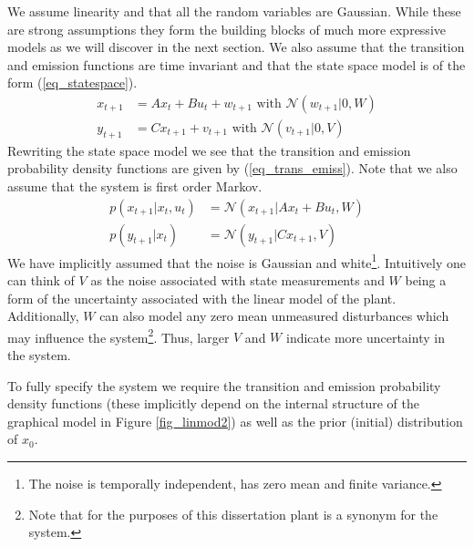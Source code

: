 We assume linearity and that all the random variables are Gaussian. While these are strong assumptions they form the building blocks of much more expressive models as we will discover in the next section. We also assume that the transition and emission functions are time invariant and that the state space model is of the form (\ref{eq_statespace}).
\begin{equation}
\begin{aligned}
x_{t+1} &= Ax_t + Bu_t + w_{t+1} \text{ with } \mathcal{N}(w_{t+1}|0,W) \\
y_{t+1} &= Cx_{t+1} + v_{t+1}  \text{ with } \mathcal{N}(v_{t+1}|0,V)
\end{aligned}
\label{eq_statespace}
\end{equation}
Rewriting the state space model we see that the transition and emission probability density functions are given by (\ref{eq_trans_emiss}). Note that we also assume that the system is first order Markov.
\begin{equation}
\begin{aligned}
p(x_{t+1}|x_t, u_t)&= \mathcal{N}(x_{t+1}|Ax_t+Bu_t, W) \\
p(y_{t+1}|x_t) &= \mathcal{N}(y_{t+1}|Cx_{t+1}, V)
\end{aligned}
\label{eq_trans_emiss}
\end{equation}
We have implicitly assumed that the noise is Gaussian and white\footnote{The noise is temporally independent, has zero mean and finite variance.}. Intuitively one can think of $V$ as the noise associated with state measurements and $W$ being a form of the uncertainty associated with the linear model of the plant. Additionally, $W$ can also model any zero mean unmeasured disturbances which may influence the system\footnote{Note that for the purposes of this dissertation plant is a synonym for the system.}. Thus, larger $V$ and $W$ indicate more uncertainty in the system. 

To fully specify the system we require the transition and emission probability density functions (these implicitly depend on the internal structure of the graphical model in Figure \ref{fig_linmod2}) as well as the prior (initial) distribution of $x_0$.


